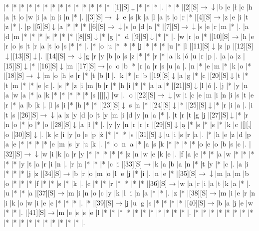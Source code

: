 \documentclass[11pt]{article}
\newcommand\drarr{$\rightarrow \!\!\!\!\! \downarrow$}
\newcommand\rarr{$\rightarrow$}
\newcommand\darr{$\downarrow$}
\begin{document}
\noindent\begin{Puzzle}{17}{31}|*	|*	|*	|*	|*	|*	|*	|*	|*	|*	|*	|*	|*	|*	|[1][S]\darr	|*	|*	|*	|.
|*	|*	|[2][S]\drarr	|b	|e	|ł	|c	|h	|a	|t	|o	|w	|i	|a	|n	|i	|n	|*	|.
|[3][S]\drarr	|e	|s	|k	|a	|l	|a	|t	|o	|r	|*	|[4][S]\rarr	|z	|e	|i	|t	|z	|*	|.
|p	|[5][S]\darr	|a	|*	|*	|*	|[6][S]\drarr	|s	|o	|d	|a	|*	|[7][S]\drarr	|s	|e	|r	|m	|*	|.
|a	|d	|m	|*	|*	|*	|s	|*	|*	|*	|[8][S]\darr	|*	|g	|*	|d	|[9][S]\darr	|*	|*	|.
|w	|r	|o	|*	|[10][S]\rarr	|h	|e	|r	|o	|s	|t	|r	|a	|t	|o	|s	|*	|*	|.
|*	|o	|u	|*	|*	|*	|j	|*	|*	|*	|u	|*	|l	|[11][S]\darr	|z	|p	|[12][S]\darr	|[13][S]\darr	|.
|[14][S]\drarr	|g	|r	|y	|b	|o	|s	|z	|*	|*	|r	|*	|a	|k	|ó	|u	|r	|p	|.
|a	|a	|z	|[15][S]\darr	|*	|[16][S]\darr	|m	|[17][S]\rarr	|c	|o	|b	|*	|r	|a	|r	|s	|u	|a	|.
|n	|*	|e	|m	|*	|k	|o	|*	|[18][S]\drarr	|m	|o	|h	|e	|r	|*	|t	|b	|l	|.
|k	|*	|c	|b	|[19][S]\darr	|a	|g	|*	|c	|[20][S]\darr	|t	|*	|t	|m	|*	|*	|e	|c	|.
|s	|*	|z	|i	|m	|b	|r	|*	|h	|i	|*	|*	|a	|a	|*	|[21][S]\darr	|l	|ó	|.
|j	|*	|y	|n	|a	|w	|a	|*	|a	|k	|*	|*	|*	|*	|*	|s	|[][,]{ }	|w	|.
|o	|[22][S]\drarr	|w	|i	|c	|e	|m	|i	|n	|i	|s	|t	|e	|r	|*	|a	|b	|k	|.
|l	|s	|i	|*	|h	|*	|*	|[23][S]\darr	|s	|n	|*	|[24][S]\darr	|*	|[25][S]\darr	|*	|r	|i	|a	|.
|i	|t	|s	|[26][S]\drarr	|a	|z	|y	|d	|o	|t	|y	|m	|i	|d	|y	|n	|a	|*	|.
|t	|r	|t	|g	|j	|[27][S]\darr	|*	|r	|n	|o	|*	|o	|*	|o	|[28][S]\darr	|a	|ł	|*	|.
|y	|y	|n	|r	|r	|r	|[29][S]\darr	|ą	|*	|s	|*	|s	|*	|k	|c	|[][,]{ }	|o	|[30][S]\darr	|.
|k	|c	|i	|y	|o	|e	|p	|ż	|*	|*	|*	|s	|[31][S]\darr	|u	|i	|s	|r	|a	|.
|*	|h	|e	|z	|d	|p	|a	|e	|*	|*	|*	|*	|e	|m	|s	|y	|u	|k	|.
|*	|o	|n	|a	|*	|a	|s	|k	|*	|*	|*	|*	|o	|e	|o	|b	|s	|c	|.
|[32][S]\drarr	|w	|i	|k	|a	|r	|y	|*	|*	|*	|*	|*	|z	|n	|w	|e	|k	|e	|.
|f	|a	|e	|*	|*	|a	|w	|*	|*	|*	|*	|*	|y	|t	|a	|r	|i	|n	|.
|r	|n	|*	|*	|*	|c	|i	|[33][S]\rarr	|k	|a	|b	|a	|n	|*	|t	|y	|*	|c	|.
|a	|i	|*	|*	|*	|j	|z	|[34][S]\rarr	|b	|r	|o	|m	|o	|l	|e	|j	|*	|i	|.
|n	|e	|*	|[35][S]\drarr	|m	|a	|m	|b	|o	|*	|*	|*	|f	|*	|*	|s	|*	|k	|.
|c	|*	|*	|r	|*	|*	|*	|*	|[36][S]\rarr	|w	|a	|r	|i	|a	|t	|k	|a	|*	|.
|u	|*	|*	|a	|[37][S]\rarr	|m	|i	|n	|o	|c	|y	|k	|l	|i	|n	|a	|*	|*	|.
|z	|*	|[38][S]\rarr	|m	|i	|e	|r	|n	|i	|k	|o	|w	|i	|e	|c	|*	|*	|*	|.
|*	|[39][S]\rarr	|j	|u	|g	|s	|*	|*	|*	|*	|[40][S]\rarr	|b	|a	|j	|e	|w	|*	|*	|.
|[41][S]\rarr	|m	|e	|s	|s	|e	|l	|*	|*	|*	|*	|*	|*	|*	|*	|*	|*	|*	|.
|*	|*	|*	|*	|*	|*	|*	|*	|*	|*	|*	|*	|*	|*	|*	|*	|*	|*	|.\end{Puzzle}

\newpage
\end{document}
